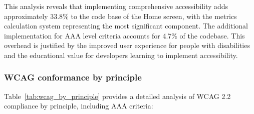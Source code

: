 
This analysis reveals that implementing comprehensive accessibility adds approximately 33.8\% to the code base of the Home screen, with the metrics calculation system representing the most significant component. The additional implementation for AAA level criteria accounts for 4.7\% of the codebase. This overhead is justified by the improved user experience for people with disabilities and the educational value for developers learning to implement accessibility.

\subsubsection{WCAG conformance by principle}

Table~\ref{tab:wcag_by_principle} provides a detailed analysis of WCAG 2.2 compliance by principle, including AAA criteria:

